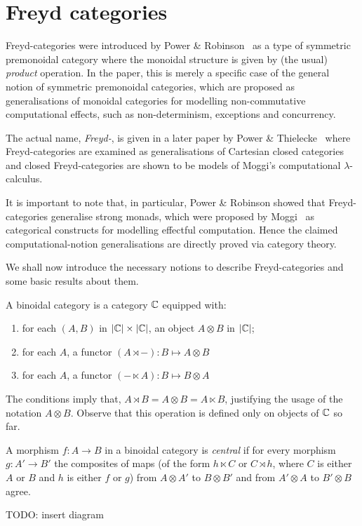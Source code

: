 \section{Freyd categories}

Freyd-categories were introduced by Power \& Robinson~\cite{pow-rob} as a type
of symmetric premonoidal category where the monoidal structure is given by
(the usual) \emph{product} operation. In the paper, this is merely a specific
case of the general notion of symmetric premonoidal categories, which are
proposed as generalisations of monoidal categories for modelling
non-commutative computational effects, such as non-determinism, exceptions and
concurrency.

The actual name, \emph{Freyd-}, is given in a later paper by Power \&
Thielecke~\cite{pow-thie} where Freyd-categories are examined as generalisations
of Cartesian closed categories and closed Freyd-categories are shown to be
models of Moggi's computational $\lambda$-calculus.

It is important to note that, in particular, Power \& Robinson showed that
Freyd-categories generalise strong monads, which were proposed by
Moggi~\cite{moggi-89} as categorical constructs for modelling effectful
computation. Hence the claimed computational-notion generalisations are
directly proved via category theory.

We shall now introduce the necessary notions to describe Freyd-categories and
some basic results about them.

\begin{definition}
    A binoidal category is a category $\mathbb{C}$ equipped with:
    \begin{enumerate}
        \item for each $(A, B)$ in $|\mathbb{C}| \times |\mathbb{C}|$, an object $A \otimes B$
            in $|\mathbb{C}|$;
        \item for each $A$, a functor $(A \rtimes -) : B \mapsto A \otimes B$
        \item for each $A$, a functor $(- \ltimes A) : B \mapsto B \otimes A$
    \end{enumerate}
\end{definition}

The conditions imply that, $A \rtimes B = A \otimes B = A \ltimes B$,
justifying the usage of the notation $A \otimes B$. Observe that this
operation is defined only on objects of $\mathbb{C}$ so far.

\begin{definition}
    A morphism $f: A \to B$ in a binoidal category is \emph{central} if for
    every morphism $g: A' \to B'$ the composites of maps (of the form $h
    \ltimes C$ or $C \rtimes h$, where $C$ is either $A$ or $B$ and $h$ is
    either $f$ or $g$) from $A \otimes A'$ to $B \otimes B'$ and from $A'
    \otimes A$ to $B' \otimes B$ agree.

    TODO: insert diagram
\end{definition}

